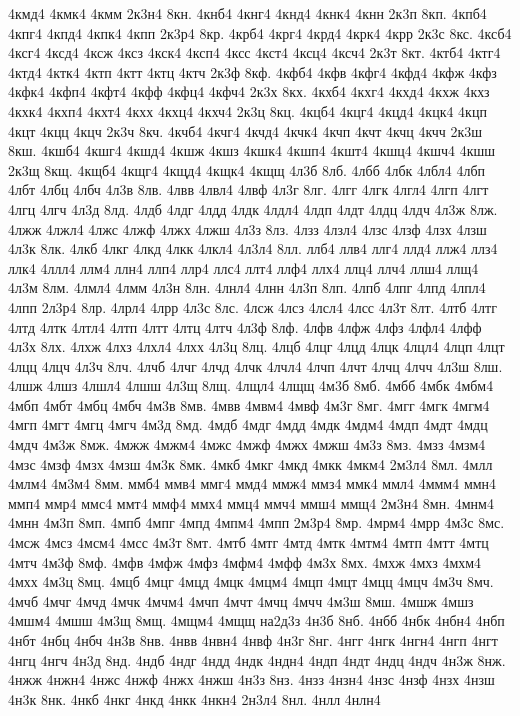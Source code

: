{4кмд4
4кмк4
4кмм
2к3н4
8кн.
4кнб4
4кнг4
4кнд4
4кнк4
4кнн
2к3п
8кп.
4кпб4
4кпг4
4кпд4
4кпк4
4кпп
2к3р4
8кр.
4крб4
4крг4
4крд4
4крк4
4крр
2к3с
8кс.
4ксб4
4ксг4
4ксд4
4ксж
4ксз
4кск4
4ксп4
4ксс
4кст4
4ксц4
4ксч4
2к3т
8кт.
4ктб4
4ктг4
4ктд4
4ктк4
4ктп
4ктт
4ктц
4ктч
2к3ф
8кф.
4кфб4
4кфв
4кфг4
4кфд4
4кфж
4кфз
4кфк4
4кфп4
4кфт4
4кфф
4кфц4
4кфч4
2к3х
8кх.
4кхб4
4кхг4
4кхд4
4кхж
4кхз
4кхк4
4кхп4
4кхт4
4кхх
4кхц4
4кхч4
2к3ц
8кц.
4кцб4
4кцг4
4кцд4
4кцк4
4кцп
4кцт
4кцц
4кцч
2к3ч
8кч.
4кчб4
4кчг4
4кчд4
4кчк4
4кчп
4кчт
4кчц
4кчч
2к3ш
8кш.
4кшб4
4кшг4
4кшд4
4кшж
4кшз
4кшк4
4кшп4
4кшт4
4кшц4
4кшч4
4кшш
2к3щ
8кщ.
4кщб4
4кщг4
4кщд4
4кщк4
4кщщ
4л3б
8лб.
4лбб
4лбк
4лбл4
4лбп
4лбт
4лбц
4лбч
4л3в
8лв.
4лвв
4лвл4
4лвф
4л3г
8лг.
4лгг
4лгк
4лгл4
4лгп
4лгт
4лгц
4лгч
4л3д
8лд.
4лдб
4лдг
4лдд
4лдк
4лдл4
4лдп
4лдт
4лдц
4лдч
4л3ж
8лж.
4лжж
4лжл4
4лжс
4лжф
4лжх
4лжш
4л3з
8лз.
4лзз
4лзл4
4лзс
4лзф
4лзх
4лзш
4л3к
8лк.
4лкб
4лкг
4лкд
4лкк
4лкл4
4л3л4
8лл.
ллб4
ллв4
ллг4
ллд4
ллж4
ллз4
ллк4
4ллл4
ллм4
ллн4
ллп4
ллр4
ллс4
ллт4
ллф4
ллх4
ллц4
ллч4
ллш4
ллщ4
4л3м
8лм.
4лмл4
4лмм
4л3н
8лн.
4лнл4
4лнн
4л3п
8лп.
4лпб
4лпг
4лпд
4лпл4
4лпп
2л3р4
8лр.
4лрл4
4лрр
4л3с
8лс.
4лсж
4лсз
4лсл4
4лсс
4л3т
8лт.
4лтб
4лтг
4лтд
4лтк
4лтл4
4лтп
4лтт
4лтц
4лтч
4л3ф
8лф.
4лфв
4лфж
4лфз
4лфл4
4лфф
4л3х
8лх.
4лхж
4лхз
4лхл4
4лхх
4л3ц
8лц.
4лцб
4лцг
4лцд
4лцк
4лцл4
4лцп
4лцт
4лцц
4лцч
4л3ч
8лч.
4лчб
4лчг
4лчд
4лчк
4лчл4
4лчп
4лчт
4лчц
4лчч
4л3ш
8лш.
4лшж
4лшз
4лшл4
4лшш
4л3щ
8лщ.
4лщл4
4лщщ
4м3б
8мб.
4мбб
4мбк
4мбм4
4мбп
4мбт
4мбц
4мбч
4м3в
8мв.
4мвв
4мвм4
4мвф
4м3г
8мг.
4мгг
4мгк
4мгм4
4мгп
4мгт
4мгц
4мгч
4м3д
8мд.
4мдб
4мдг
4мдд
4мдк
4мдм4
4мдп
4мдт
4мдц
4мдч
4м3ж
8мж.
4мжж
4мжм4
4мжс
4мжф
4мжх
4мжш
4м3з
8мз.
4мзз
4мзм4
4мзс
4мзф
4мзх
4мзш
4м3к
8мк.
4мкб
4мкг
4мкд
4мкк
4мкм4
2м3л4
8мл.
4млл
4млм4
4м3м4
8мм.
ммб4
ммв4
ммг4
ммд4
ммж4
ммз4
ммк4
ммл4
4ммм4
ммн4
ммп4
ммр4
ммс4
ммт4
ммф4
ммх4
ммц4
ммч4
ммш4
ммщ4
2м3н4
8мн.
4мнм4
4мнн
4м3п
8мп.
4мпб
4мпг
4мпд
4мпм4
4мпп
2м3р4
8мр.
4мрм4
4мрр
4м3с
8мс.
4мсж
4мсз
4мсм4
4мсс
4м3т
8мт.
4мтб
4мтг
4мтд
4мтк
4мтм4
4мтп
4мтт
4мтц
4мтч
4м3ф
8мф.
4мфв
4мфж
4мфз
4мфм4
4мфф
4м3х
8мх.
4мхж
4мхз
4мхм4
4мхх
4м3ц
8мц.
4мцб
4мцг
4мцд
4мцк
4мцм4
4мцп
4мцт
4мцц
4мцч
4м3ч
8мч.
4мчб
4мчг
4мчд
4мчк
4мчм4
4мчп
4мчт
4мчц
4мчч
4м3ш
8мш.
4мшж
4мшз
4мшм4
4мшш
4м3щ
8мщ.
4мщм4
4мщщ
на2д3з
4н3б
8нб.
4нбб
4нбк
4нбн4
4нбп
4нбт
4нбц
4нбч
4н3в
8нв.
4нвв
4нвн4
4нвф
4н3г
8нг.
4нгг
4нгк
4нгн4
4нгп
4нгт
4нгц
4нгч
4н3д
8нд.
4ндб
4ндг
4ндд
4ндк
4ндн4
4ндп
4ндт
4ндц
4ндч
4н3ж
8нж.
4нжж
4нжн4
4нжс
4нжф
4нжх
4нжш
4н3з
8нз.
4нзз
4нзн4
4нзс
4нзф
4нзх
4нзш
4н3к
8нк.
4нкб
4нкг
4нкд
4нкк
4нкн4
2н3л4
8нл.
4нлл
4нлн4
}
